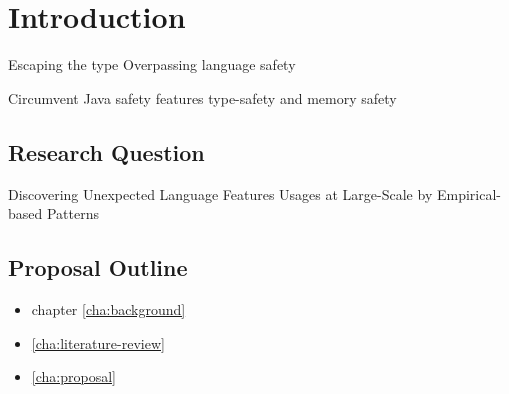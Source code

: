 
\chapter{Introduction}


\cite{milner_theory_1978}

Escaping the type 
Overpassing 
language safety

Circumvent Java safety features
type-safety and memory safety

\section{Research Question}


Discovering Unexpected Language Features Usages at Large-Scale by Empirical-based Patterns

\section{Proposal Outline}

\begin{itemize}
\item chapter \ref{cha:background}
\item \ref{cha:literature-review}
\item \ref{cha:proposal}
\end{itemize}